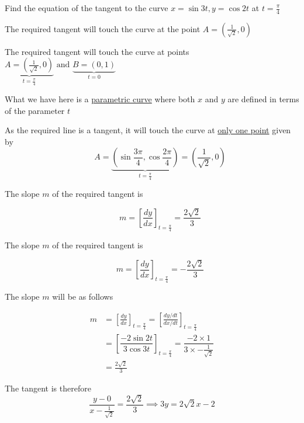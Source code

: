 \documentclass[14pt,fleqn]{extarticle}
\begin{document}
Find the equation of the tangent to the 
curve $x = \sin 3t, y = \cos 2t$ at $t = \frac\pi{4}$
%

\newcard

The required tangent will touch the curve at 
the point $A = \left(\frac{1}{\sqrt{2}},0 \right)$
%

\newcard

The required tangent will touch the curve at points 
$\underbrace{A = \left(\frac{1}{\sqrt{2}},0 \right)}_{t = \frac\pi{4}} \text{ and } \underbrace{B = \left(0,1\right)}_{t = 0}$
%

\newcard

What we have here is a \underline{parametric curve}
where both $x$ and $y$ are defined in terms 
of the parameter $t$\newline 

As the required line is a tangent, it 
will touch the curve at \underline{only one point} given by
\[ \qquad A = \underbrace{\left(\sin\frac{3\pi}{4}, \cos\frac{2\pi}{4} \right)}_{t=\frac\pi{4}} = \left(\frac{1}{\sqrt{2}}, 0 \right)\]

%

\newcard

The slope $m$ of the required tangent is

\[ \qquad m = \left[\dfrac{dy}{dx}\right]_{t=\frac\pi{4}} = \frac{2\sqrt{2}}{3}\]


\newcard

The slope $m$ of the required tangent is 

\[ \qquad m = \left[\dfrac{dy}{dx}\right]_{t=\frac\pi{4}} = -\frac{2\sqrt{2}}{3}\]
%

\newcard

The slope $m$ will be as follows  

%
\begin{align}
m &= \left[\frac{dy}{dx}\right]_{t=\frac\pi{4}} = \left[\frac{dy / dt}{dx / dt}\right]_{t=\frac\pi{4}} \\
&= \left[\dfrac{-2\sin 2t}{3\cos 3t}\right]_{t=\frac\pi{4}} = \dfrac{-2\times 1}{3\times -\frac{1}{\sqrt{2}}} \\
&= \frac{2\sqrt{2}}{3} 
\end{align}

\newcard

The tangent is therefore 
\[\frac{y - 0}{x - \frac{1}{\sqrt{2}}} = \frac{2\sqrt{2}}{3}
\implies 3y = 2\sqrt{2} x -2 \]


\newcard
\end{document}
